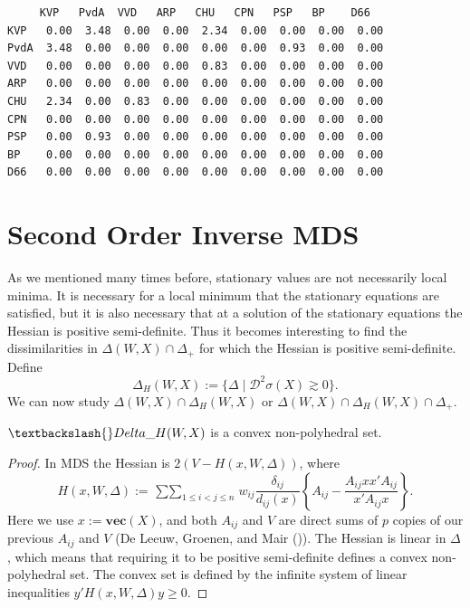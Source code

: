\documentclass[
  12pt,
  letterpaper,
  DIV=11,
  numbers=noendperiod]{scrreprt}
\newenvironment{Shaded}{\begin{snugshade}}{\end{snugshade}}
\newcommand{\NormalTok}[1]{\textcolor[rgb]{0.00,0.23,0.31}{#1}}
\theoremstyle{remark}
\begin{document}
\begin{verbatim}
     KVP   PvdA  VVD   ARP   CHU   CPN   PSP   BP    D66  
KVP   0.00  3.48  0.00  0.00  2.34  0.00  0.00  0.00  0.00
PvdA  3.48  0.00  0.00  0.00  0.00  0.00  0.93  0.00  0.00
VVD   0.00  0.00  0.00  0.00  0.83  0.00  0.00  0.00  0.00
ARP   0.00  0.00  0.00  0.00  0.00  0.00  0.00  0.00  0.00
CHU   2.34  0.00  0.83  0.00  0.00  0.00  0.00  0.00  0.00
CPN   0.00  0.00  0.00  0.00  0.00  0.00  0.00  0.00  0.00
PSP   0.00  0.93  0.00  0.00  0.00  0.00  0.00  0.00  0.00
BP    0.00  0.00  0.00  0.00  0.00  0.00  0.00  0.00  0.00
D66   0.00  0.00  0.00  0.00  0.00  0.00  0.00  0.00  0.00
\end{verbatim}

\section{Second Order Inverse MDS}\label{second-order-inverse-mds}

As we mentioned many times before, stationary values are not necessarily
local minima. It is necessary for a local minimum that the stationary
equations are satisfied, but it is also necessary that at a solution of
the stationary equations the Hessian is positive semi-definite. Thus it
becomes interesting to find the dissimilarities in
\(\Delta(W,X)\cap\Delta_+\) for which the Hessian is positive
semi-definite. Define \[
\Delta_H(W,X):=\{\Delta\mid\mathcal{D}^2\sigma(X)\gtrsim 0\}.
\] We can now study \(\Delta(W,X)\cap\Delta_H(W,X)\) or
\(\Delta(W,X)\cap\Delta_H(W,X)\cap\Delta_+\).

\begin{Shaded}
\begin{Highlighting}[]
\NormalTok{$\textbackslash{}Delta\_H(W,X)$ is a convex non{-}polyhedral set.}
\end{Highlighting}
\end{Shaded}

\begin{proof}
In MDS the Hessian is \(2(V-H(x,W,\Delta))\), where \begin{equation}
H(x,W,\Delta):=\mathop{\sum\sum}_{1\leq i<j\leq n}w_{ij}\frac{\delta_{ij}}{d_{ij}(x)}\left\{A_{ij}-\frac{A_{ij}xx'A_{ij}}{x'A_{ij}x}\right\}.
\end{equation} Here we use \(x:=\mathbf{vec}(X)\), and both \(A_{ij}\)
and \(V\) are direct sums of \(p\) copies of our previous \(A_{ij}\) and
\(V\) (De Leeuw, Groenen, and Mair
()). The Hessian is
linear in \(\Delta\), which means that requiring it to be positive
semi-definite defines a convex non-polyhedral set. The convex set is
defined by the infinite system of linear inequalities
\(y'H(x,W,\Delta)y\geq 0\).
\end{proof}
\end{document}
